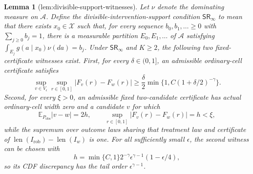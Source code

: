 \documentclass{article}
\newtheorem{lemma}{Lemma}
\begin{document}
\begin{lemma}[lem:divisible-support-witnesses]\label{lem:divisible-support-witnesses}
Let \(\nu\) denote the dominating measure on \(\mathcal A\). Define the divisible-intervention-support condition \(\mathsf{SR}_\infty\) to mean that there exists \(x_0\in\mathcal X\) such that, for every sequence \(b_0,b_1,\ldots\ge0\) with \(\sum_{j\ge0}b_j=1\), there is a measurable partition \(E_0,E_1,\ldots\) of \(\mathcal A\) satisfying \(\int_{E_j}g(a\mid x_0)\nu(da)=b_j\). Under \(\mathsf{SR}_\infty\) and \(K\ge2\), the following two fixed-certificate witnesses exist. First, for every \(\delta\in(0,1]\), an admissible ordinary-cell certificate satisfies
\[
\sup_{v\in V_\epsilon}\sup_{r\in[0,1]}|F_v(r)-F_w(r)|
\ge\frac{\delta}{2}\min\{1,C(1+\delta/2)^{-\gamma}\}.
\]
Second, for every \(\xi>0\), an admissible fixed two-candidate certificate has actual ordinary-cell width zero and a candidate \(v\) for which
\[
\mathbb E_{P_{\mathrm{obs}}}|v-w|=2h,\qquad
\sup_{r\in[0,1]}|F_v(r)-F_w(r)|=h<\xi,
\]
while the supremum over outcome laws sharing that treatment law and certificate of \(\operatorname{len}(I_{\mathrm{rob}})-\operatorname{len}(I_w)\) is one. For all sufficiently small \(\epsilon\), the second witness can be chosen with
\[
h=\min\{C,1\}2^{-\gamma}\epsilon^{\gamma-1}(1-\epsilon/4),
\]
so its CDF discrepancy has the tail order \(\epsilon^{\gamma-1}\).
\end{lemma}
\end{document}
